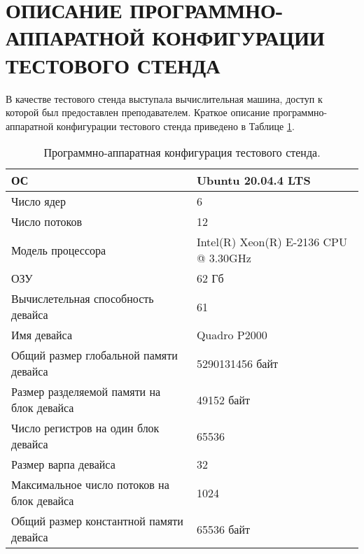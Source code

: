 \section{ОПИСАНИЕ ПРОГРАММНО-АППАРАТНОЙ КОНФИГУРАЦИИ ТЕСТОВОГО СТЕНДА}

В качестве тестового стенда выступала вычислительная машина, доступ к которой был предоставлен преподавателем. Краткое описание программно-аппаратной конфигурации тестового стенда приведено в Таблице \ref{tab:1}.
\begin{table}[!ht]
    \centering
    \begin{tabular}{|l|l|}
    \hline
        ОС & Ubuntu 20.04.4 LTS \\ \hline
        Число ядер & 6 \\ \hline
        Число потоков & 12 \\ \hline
        Модель процессора & Intel(R) Xeon(R) E-2136 CPU @ 3.30GHz \\ \hline
        ОЗУ & 62 Гб \\ \hline
        Вычислетельная способность девайса & 61 \\ \hline
        Имя девайса &	Quadro P2000\\ \hline
        Общий размер глобальной памяти девайса & 5290131456 байт \\ \hline
        Размер разделяемой памяти на блок девайса &	49152 байт \\ \hline
        Число регистров на один блок девайса &	65536 \\ \hline
        Размер варпа девайса  &	32 \\ \hline
        Максимальное число потоков на блок девайса &	1024\\ \hline
        Общий размер константной памяти девайса &	65536 байт \\ \hline
    \end{tabular}
    \caption{Программно-аппаратная конфигурация тестового стенда.}
    \label{tab:1}
\end{table}